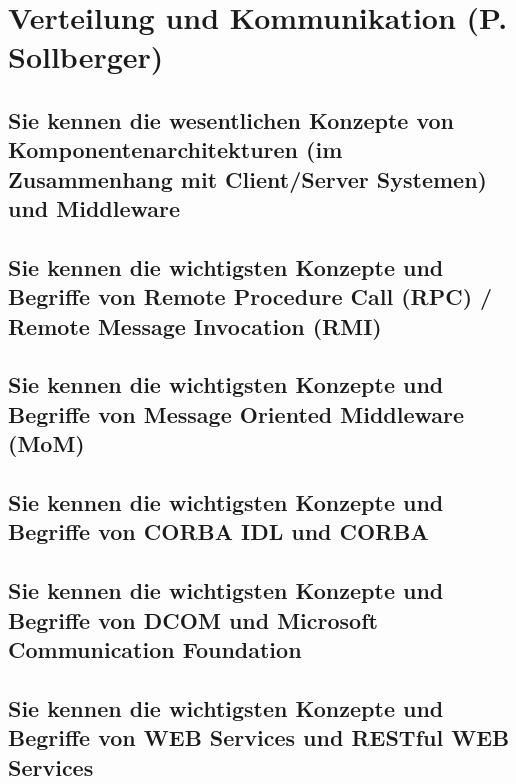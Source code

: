 \section{Verteilung und Kommunikation (P. Sollberger)}
\label{sec:sollberger}

\subsection{Sie kennen die wesentlichen Konzepte von Komponentenarchitekturen (im Zusammenhang mit Client/Server Systemen) und Middleware}
\subsection{Sie kennen die wichtigsten Konzepte und Begriffe von Remote Procedure Call (RPC) / Remote Message Invocation (RMI)}
\subsection{Sie kennen die wichtigsten Konzepte und Begriffe von Message Oriented Middleware (MoM)}
\subsection{Sie kennen die wichtigsten Konzepte und Begriffe von CORBA IDL und CORBA}
\subsection{Sie kennen die wichtigsten Konzepte und Begriffe von DCOM und Microsoft Communication Foundation}
\subsection{Sie kennen die wichtigsten Konzepte und Begriffe von WEB Services und RESTful WEB Services}